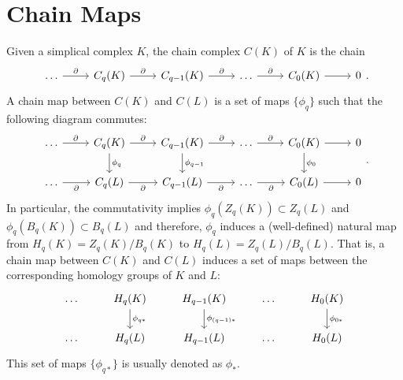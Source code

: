 \section{Chain Maps}
Given a simplical complex $K$, the chain complex $C(K)$ of $K$ is the chain
\[
    \begin{tikzcd}
        \dots \arrow[r, "\partial"] & C_q(K) \arrow[r, "\partial"] & C_{q-1}(K) \arrow[r, "\partial"] & \dots \arrow[r, "\partial"] & C_0(K) \arrow[r] & 0
    \end{tikzcd}.
\]
A chain map between $C(K)$ and $C(L)$ is a set of maps $\{\phi_q\}$ such that the following diagram commutes:
\[
    \begin{tikzcd}
        \dots \arrow[r, "\partial"]  & C_q(K) \arrow[r, "\partial"] \arrow[d, "\phi_q"] & C_{q-1}(K) \arrow[r, "\partial"] \arrow[d, "\phi_{q-1}"] & \dots \arrow[r, "\partial"]  & C_0(K) \arrow[r] \arrow[d, "\phi_0"] & 0 \\
        \dots \arrow[r, "\partial"'] & C_q(L) \arrow[r, "\partial"']                 & C_{q-1}(L) \arrow[r, "\partial"']                     & \dots \arrow[r, "\partial"'] & C_0(L) \arrow[r]                  & 0
    \end{tikzcd}.
\]
In particular, the commutativity implies $\phi_q(Z_q(K)) \subset Z_q(L)$ and $\phi_q(B_q(K)) \subset B_q(L)$ and therefore, $\phi_q$ induces a (well-defined) natural map from $H_q(K) = Z_q(K) / B_q(K)$ to $H_q(L) = Z_q(L) / B_q(L)$. That is, a chain map between $C(K)$ and $C(L)$ induces a set of maps between the corresponding homology groups of $K$ and $L$:
\[
    \begin{tikzcd}
        \dots & H_q(K) \arrow[d, "\phi_{q*}"] & H_{q-1}(K) \arrow[d, "\phi_{(q-1)*}"] & \dots & H_0(K) \arrow[d, "\phi_{0*}"] \\
        \dots & H_q(L)                     & H_{q-1}(L)                         & \dots & H_0(L)                  
    \end{tikzcd}
\]
This set of maps $\{\phi_{q*}\}$ is usually denoted as $\phi_*$.